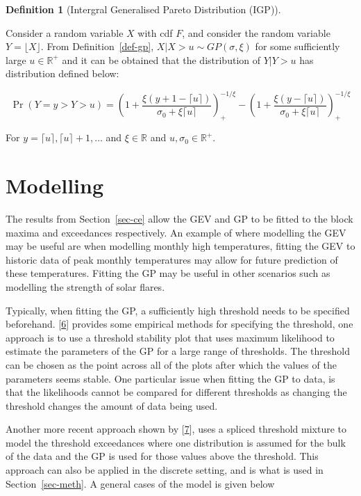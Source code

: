 \documentclass[
  10pt,
  a4paper,
]{scrreprt}
\theoremstyle{plain}
\theoremstyle{plain}
\theoremstyle{definition}
\newtheorem{definition}{Definition}[section]
\theoremstyle{plain}
\theoremstyle{remark}
\begin{document}
{\begin{definition}[Intergral Generalised Pareto Distribution
(IGP)]\protect\hypertarget{def-igp}{}\label{def-igp}

Consider a random variable \(X\) with cdf \(F\), and consider the random
variable \(Y=\lfloor X \rfloor\). From Definition~\ref{def-gp},
\(X|X>u \sim GP(\sigma, \xi)\) for some sufficiently large
\(u\in \mathbb R^+\) and it can be obtained that the distribution of
\(Y|Y>u\) has distribution defined below:

\[
\Pr(Y=y>Y>u) = \left(1+\displaystyle\frac{\xi(y+1-\lceil u\rceil)}{\sigma_0+\xi\lceil u\rceil}\right)_+^{-1/\xi}-\left(1+\displaystyle\frac{\xi(y-\lceil u\rceil)}{\sigma_0+\xi\lceil u\rceil}\right)_+^{-1/\xi}
\]

For \(y=\lceil u\rceil,\lceil u\rceil+1, \ldots\) and
\(\xi \in \mathbb R\) and \(u, \sigma_0 \in \mathbb R^+.\)

\end{definition}

\hypertarget{sec-mod}{%
\section{Modelling}\label{sec-mod}}

The results from Section~\ref{sec-ce} allow the GEV and GP to be fitted
to the block maxima and exceedances respectively. An example of where
modelling the GEV may be useful are when modelling monthly high
temperatures, fitting the GEV to historic data of peak monthly
temperatures may allow for future prediction of these temperatures.
Fitting the GP may be useful in other scenarios such as modelling the
strength of solar flares.

Typically, when fitting the GP, a sufficiently high threshold needs to
be specified beforehand. {[}\protect\hyperlink{ref-coles2001}{6}{]}
provides some empirical methods for specifying the threshold, one
approach is to use a threshold stability plot that uses maximum
likelihood to estimate the parameters of the GP for a large range of
thresholds. The threshold can be chosen as the point across all of the
plots after which the values of the parameters seems stable. One
particular issue when fitting the GP to data, is that the likelihoods
cannot be compared for different thresholds as changing the threshold
changes the amount of data being used.

Another more recent approach shown by
{[}\protect\hyperlink{ref-mac2012}{7}{]}, uses a spliced threshold
mixture to model the threshold exceedances where one distribution is
assumed for the bulk of the data and the GP is used for those values
above the threshold. This approach can also be applied in the discrete
setting, and is what is used in Section~\ref{sec-meth}. A general cases
of the model is given below

}
\end{document}
